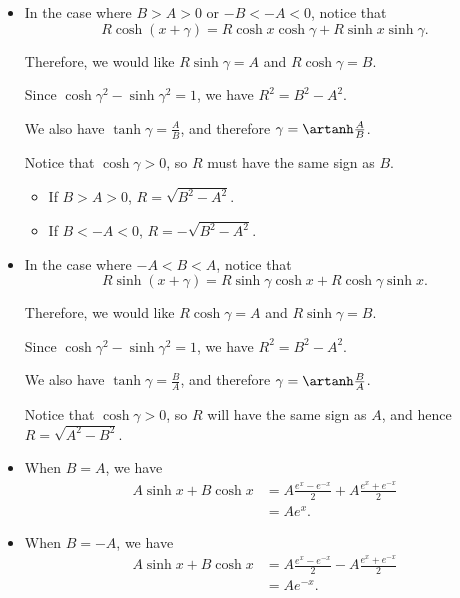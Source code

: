 \Question{\currfilebase}

\begin{itemize}
    \item In the case where \(B > A > 0\) or \(-B < -A < 0\), notice that
          \[
              R \cosh(x + \gamma) = R \cosh x \cosh \gamma + R \sinh x \sinh\gamma.
          \]

          Therefore, we would like \(R \sinh \gamma = A\) and \(R \cosh \gamma = B\).

          Since \(\cosh \gamma^2 - \sinh \gamma^2 = 1\), we have \(R^2 = B^2 - A^2\).

          We also have \(\tanh \gamma = \frac{A}{B}\), and therefore \(\gamma = \artanh \frac{A}{B}\).

          Notice that \(\cosh \gamma > 0\), so \(R\) must have the same sign as \(B\).

          \begin{itemize}
              \item If \(B > A > 0\), \(R = \sqrt{B^2 - A^2}\).

              \item If \(B < -A < 0\), \(R = - \sqrt{B^2 - A^2}\).
          \end{itemize}

    \item In the case where \(-A < B < A\), notice that
          \[
              R \sinh (x + \gamma) = R \sinh \gamma \cosh x + R \cosh \gamma \sinh x.
          \]

          Therefore, we would like \(R \cosh \gamma = A\) and \(R \sinh \gamma = B\).

          Since \(\cosh \gamma^2 - \sinh \gamma^2 = 1\), we have \(R^2 = B^2 - A^2\).

          We also have \(\tanh \gamma = \frac{B}{A}\), and therefore \(\gamma = \artanh \frac{B}{A}\).

          Notice that \(\cosh \gamma > 0\), so \(R\) will have the same sign as \(A\), and hence \(R = \sqrt{A^2 - B^2}\).

    \item When \(B = A\), we have
          \begin{align*}
              A \sinh x + B \cosh x & = A \frac{e^x - e^{-x}}{2} + A \frac{e^x + e^{-x}}{2} \\
                                    & = A e^x.
          \end{align*}

    \item When \(B = -A\), we have
          \begin{align*}
              A \sinh x + B \cosh x & = A \frac{e^x - e^{-x}}{2} - A \frac{e^x + e^{-x}}{2} \\
                                    & = A e^{-x}.
          \end{align*}
\end{itemize}

